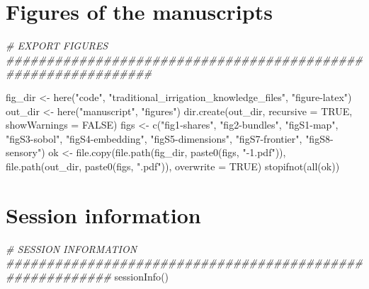 \documentclass[
  11pt,
]{article}
\newenvironment{Shaded}{\begin{snugshade}}{\end{snugshade}}
\newcommand{\AttributeTok}[1]{\textcolor[rgb]{0.77,0.63,0.00}{#1}}
\newcommand{\CommentTok}[1]{\textcolor[rgb]{0.56,0.35,0.01}{\textit{#1}}}
\newcommand{\ConstantTok}[1]{\textcolor[rgb]{0.00,0.00,0.00}{#1}}
\newcommand{\FunctionTok}[1]{\textcolor[rgb]{0.00,0.00,0.00}{#1}}
\newcommand{\NormalTok}[1]{#1}
\newcommand{\OtherTok}[1]{\textcolor[rgb]{0.56,0.35,0.01}{#1}}
\newcommand{\StringTok}[1]{\textcolor[rgb]{0.31,0.60,0.02}{#1}}
\begin{document}
\hypertarget{figures-of-the-manuscripts}{%
\section{Figures of the manuscripts}\label{figures-of-the-manuscripts}}

\begin{Shaded}
\begin{Highlighting}[]
\CommentTok{\# EXPORT FIGURES \#\#\#\#\#\#\#\#\#\#\#\#\#\#\#\#\#\#\#\#\#\#\#\#\#\#\#\#\#\#\#\#\#\#\#\#\#\#\#\#\#\#\#\#\#\#\#\#\#\#\#\#\#\#\#\#\#\#\#\#\#\#}

\NormalTok{fig\_dir }\OtherTok{\textless{}{-}} \FunctionTok{here}\NormalTok{(}\StringTok{"code"}\NormalTok{, }\StringTok{"traditional\_irrigation\_knowledge\_files"}\NormalTok{, }\StringTok{"figure{-}latex"}\NormalTok{)}
\NormalTok{out\_dir }\OtherTok{\textless{}{-}} \FunctionTok{here}\NormalTok{(}\StringTok{"manuscript"}\NormalTok{, }\StringTok{"figures"}\NormalTok{)}
\FunctionTok{dir.create}\NormalTok{(out\_dir, }\AttributeTok{recursive =} \ConstantTok{TRUE}\NormalTok{, }\AttributeTok{showWarnings =} \ConstantTok{FALSE}\NormalTok{)}
\NormalTok{figs }\OtherTok{\textless{}{-}} \FunctionTok{c}\NormalTok{(}\StringTok{"fig1{-}shares"}\NormalTok{, }\StringTok{"fig2{-}bundles"}\NormalTok{, }\StringTok{"figS1{-}map"}\NormalTok{, }\StringTok{"figS3{-}sobol"}\NormalTok{,}
          \StringTok{"figS4{-}embedding"}\NormalTok{, }\StringTok{"figS5{-}dimensions"}\NormalTok{, }\StringTok{"figS7{-}frontier"}\NormalTok{, }\StringTok{"figS8{-}sensory"}\NormalTok{)}
\NormalTok{ok }\OtherTok{\textless{}{-}} \FunctionTok{file.copy}\NormalTok{(}\FunctionTok{file.path}\NormalTok{(fig\_dir, }\FunctionTok{paste0}\NormalTok{(figs, }\StringTok{"{-}1.pdf"}\NormalTok{)),}
                \FunctionTok{file.path}\NormalTok{(out\_dir, }\FunctionTok{paste0}\NormalTok{(figs, }\StringTok{".pdf"}\NormalTok{)), }\AttributeTok{overwrite =} \ConstantTok{TRUE}\NormalTok{)}
\FunctionTok{stopifnot}\NormalTok{(}\FunctionTok{all}\NormalTok{(ok))}
\end{Highlighting}
\end{Shaded}

\newpage

\hypertarget{session-information}{%
\section{Session information}\label{session-information}}

\begin{Shaded}
\begin{Highlighting}[]
\CommentTok{\# SESSION INFORMATION \#\#\#\#\#\#\#\#\#\#\#\#\#\#\#\#\#\#\#\#\#\#\#\#\#\#\#\#\#\#\#\#\#\#\#\#\#\#\#\#\#\#\#\#\#\#\#\#\#\#\#\#\#\#\#\#\#}
\FunctionTok{sessionInfo}\NormalTok{()}
\end{Highlighting}
\end{Shaded}
\end{document}
